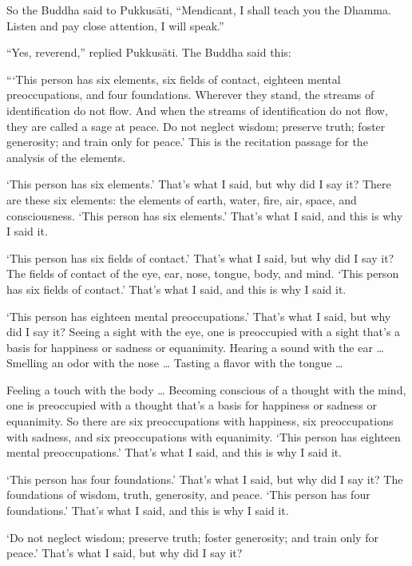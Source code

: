\documentclass[12pt,openany]{book}%
\begin{document}
So the Buddha said to \textsanskrit{Pukkusāti}, “Mendicant, I shall teach you the Dhamma. Listen and pay close attention, I will speak.” 

“Yes, reverend,” replied \textsanskrit{Pukkusāti}. The Buddha said this: 

“‘This person has six elements, six fields of contact, eighteen mental preoccupations, and four foundations. Wherever they stand, the streams of identification do not flow. And when the streams of identification do not flow, they are called a sage at peace. Do not neglect wisdom; preserve truth; foster generosity; and train only for peace.’ This is the recitation passage for the analysis of the elements. 

‘This person has six elements.’ That’s what I said, but why did I say it? There are these six elements: the elements of earth, water, fire, air, space, and consciousness. ‘This person has six elements.’ That’s what I said, and this is why I said it. 

‘This person has six fields of contact.’ That’s what I said, but why did I say it? The fields of contact of the eye, ear, nose, tongue, body, and mind. ‘This person has six fields of contact.’ That’s what I said, and this is why I said it. 

‘This person has eighteen mental preoccupations.’ That’s what I said, but why did I say it? Seeing a sight with the eye, one is preoccupied with a sight that’s a basis for happiness or sadness or equanimity. Hearing a sound with the ear … Smelling an odor with the nose … Tasting a flavor with the tongue … 

Feeling a touch with the body … Becoming conscious of a thought with the mind, one is preoccupied with a thought that’s a basis for happiness or sadness or equanimity. So there are six preoccupations with happiness, six preoccupations with sadness, and six preoccupations with equanimity. ‘This person has eighteen mental preoccupations.’ That’s what I said, and this is why I said it. 

‘This person has four foundations.’ That’s what I said, but why did I say it? The foundations of wisdom, truth, generosity, and peace. ‘This person has four foundations.’ That’s what I said, and this is why I said it. 

‘Do not neglect wisdom; preserve truth; foster generosity; and train only for peace.’ That’s what I said, but why did I say it? 
\end{document}
